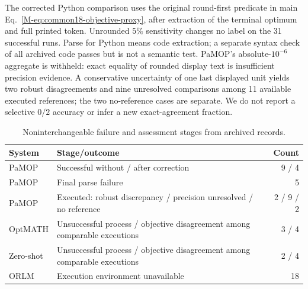 The corrected Python comparison uses the original round-first predicate in main Eq.~\eqref{M-eq:common18-objective-proxy}, after extraction of the terminal optimum and full printed token. Unrounded $5\%$ sensitivity changes no label on the 31 successful runs. Parse for Python means code extraction; a separate syntax check of all archived code passes but is not a semantic test. PaMOP's absolute-$10^{-6}$ aggregate is withheld: exact equality of rounded display text is insufficient precision evidence. A conservative uncertainty of one last displayed unit yields two robust disagreements and nine unresolved comparisons among 11 available executed references; the two no-reference cases are separate. We do not report a selective $0/2$ accuracy or infer a new exact-agreement fraction.

\begin{table}[htbp]\centering\small
\caption{Noninterchangeable failure and assessment stages from archived records.}\label{tab:llm-failures}
\begin{tabularx}{\linewidth}{@{}lXr@{}}\toprule
System & Stage/outcome & Count\\\midrule
PaMOP & Successful without / after correction & 9 / 4\\
PaMOP & Final parse failure & 5\\
PaMOP & Executed: robust discrepancy / precision unresolved / no reference & 2 / 9 / 2\\
OptMATH & Unsuccessful process / objective disagreement among comparable executions & 3 / 4\\
Zero-shot & Unsuccessful process / objective disagreement among comparable executions & 2 / 4\\
ORLM & Execution environment unavailable & 18\\\bottomrule
\end{tabularx}\end{table}

